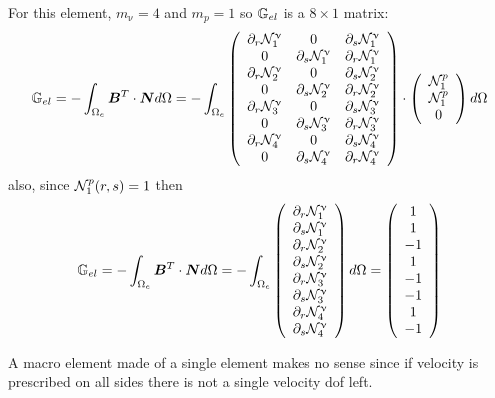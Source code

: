 For this element, $m_\upnu=4$ and $m_p=1$ so ${\mathbb{G}}_{el}$ is
a $8\times 1$ matrix:
\[
{\mathbb{G}}_{el} = -\int_{\Omega_e} {\bm B}^T \cdot {\bm N} d\Omega
= -\int_{\Omega_e}
\left(
\begin{array}{ccc}
\partial_r {\mathcal{N}}_1^\upnu & 0 & \partial_s {\mathcal{N}}_1^\upnu \\
0 & \partial_s {\mathcal{N}}_1^\upnu & \partial_r {\mathcal{N}}_1^\upnu \\
\partial_r {\mathcal{N}}_2^\upnu & 0 & \partial_s {\mathcal{N}}_2^\upnu \\
0 & \partial_s {\mathcal{N}}_2^\upnu & \partial_r {\mathcal{N}}_2^\upnu \\
\partial_r {\mathcal{N}}_3^\upnu & 0 & \partial_s {\mathcal{N}}_3^\upnu \\
0 & \partial_s {\mathcal{N}}_3^\upnu & \partial_r {\mathcal{N}}_3^\upnu \\
\partial_r {\mathcal{N}}_4^\upnu & 0 & \partial_s {\mathcal{N}}_4^\upnu \\
0 & \partial_s {\mathcal{N}}_4^\upnu & \partial_r {\mathcal{N}}_4^\upnu 
\end{array}
\right)
\cdot
\left(
\begin{array}{c}
{\mathcal{N}}_1^p  \\ 
{\mathcal{N}}_1^p  \\ 
0 
\end{array}
\right)
d\Omega
\]
also, since ${\mathcal{N}}_1^p(r,s)=1$ then
\[
{\mathbb{G}}_{el} = -\int_{\Omega_e} {\bm B}^T \cdot {\bm N} d\Omega
= -\int_{\Omega_e}
\left(
\begin{array}{ccc}
\partial_r {\mathcal{N}}_1^\upnu  \\
\partial_s {\mathcal{N}}_1^\upnu  \\
\partial_r {\mathcal{N}}_2^\upnu  \\
\partial_s {\mathcal{N}}_2^\upnu  \\
\partial_r {\mathcal{N}}_3^\upnu  \\
\partial_s {\mathcal{N}}_3^\upnu  \\
\partial_r {\mathcal{N}}_4^\upnu  \\
\partial_s {\mathcal{N}}_4^\upnu  
\end{array}
\right)
d\Omega
=
\left(
\begin{array}{c}
 1\\
 1\\
-1\\
 1\\
-1\\
-1\\
 1\\
-1
\end{array}
\right)
\]

A macro element made of a single element makes no sense since if velocity
is prescribed on all sides there is not a single velocity dof left.

